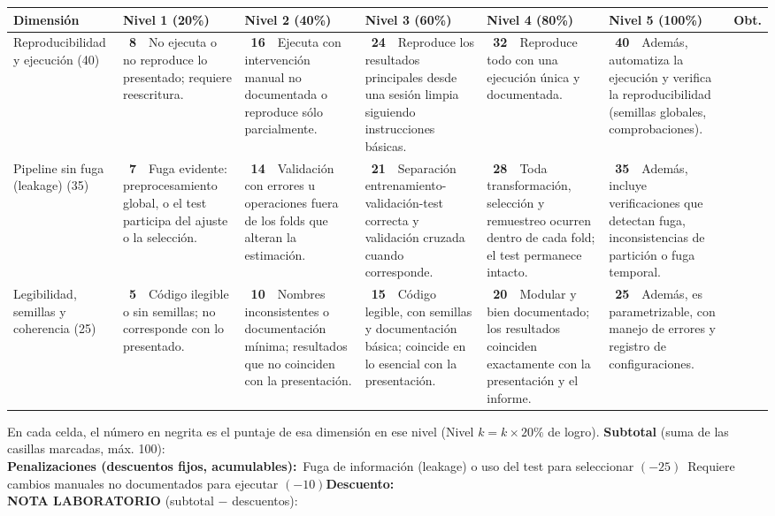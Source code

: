 \documentclass[11pt,letterpaper]{article}
\newcommand{\chk}{\framebox[0.42cm]{\rule{0pt}{0.30cm}}}
\begin{document}
\footnotesize\renewcommand{\arraystretch}{1.15}
\begin{tabular}{p{2.4cm} p{3.15cm} p{3.15cm} p{3.15cm} p{3.15cm} p{3.15cm} p{1.2cm}}
\toprule
Dimensión & Nivel 1 (20\%) & Nivel 2 (40\%) & Nivel 3 (60\%) & Nivel 4 (80\%) & Nivel 5 (100\%) & Obt. \\
\midrule
Reproducibilidad y ejecución (40) & \chk\ \textbf{8}~~No ejecuta o no reproduce lo presentado; requiere reescritura. & \chk\ \textbf{16}~~Ejecuta con intervención manual no documentada o reproduce sólo parcialmente. & \chk\ \textbf{24}~~Reproduce los resultados principales desde una sesión limpia siguiendo instrucciones básicas. & \chk\ \textbf{32}~~Reproduce todo con una ejecución única y documentada. & \chk\ \textbf{40}~~Además, automatiza la ejecución y verifica la reproducibilidad (semillas globales, comprobaciones). & \rule{0pt}{0.7cm} \\
Pipeline sin fuga (leakage) (35) & \chk\ \textbf{7}~~Fuga evidente: preprocesamiento global, o el test participa del ajuste o la selección. & \chk\ \textbf{14}~~Validación con errores u operaciones fuera de los folds que alteran la estimación. & \chk\ \textbf{21}~~Separación entrenamiento-validación-test correcta y validación cruzada cuando corresponde. & \chk\ \textbf{28}~~Toda transformación, selección y remuestreo ocurren dentro de cada fold; el test permanece intacto. & \chk\ \textbf{35}~~Además, incluye verificaciones que detectan fuga, inconsistencias de partición o fuga temporal. & \rule{0pt}{0.7cm} \\
Legibilidad, semillas y coherencia (25) & \chk\ \textbf{5}~~Código ilegible o sin semillas; no corresponde con lo presentado. & \chk\ \textbf{10}~~Nombres inconsistentes o documentación mínima; resultados que no coinciden con la presentación. & \chk\ \textbf{15}~~Código legible, con semillas y documentación básica; coincide en lo esencial con la presentación. & \chk\ \textbf{20}~~Modular y bien documentado; los resultados coinciden exactamente con la presentación y el informe. & \chk\ \textbf{25}~~Además, es parametrizable, con manejo de errores y registro de configuraciones. & \rule{0pt}{0.7cm} \\
\bottomrule
\end{tabular}

\vspace{0.2cm}
{\small
En cada celda, el número en negrita es el puntaje de esa dimensión en ese nivel (Nivel $k = k\times 20\%$ de logro). \textbf{Subtotal} (suma de las casillas marcadas, máx. 100): \underline{\hspace{2cm}}\\[0.2cm]
\textbf{Penalizaciones (descuentos fijos, acumulables):}\quad \chk\ Fuga de información (leakage) o uso del test para seleccionar $(-25)$\quad \chk\ Requiere cambios manuales no documentados para ejecutar $(-10)$\quad \textbf{Descuento:} \underline{\hspace{1.6cm}}\\[0.2cm]
\textbf{NOTA LABORATORIO} (subtotal $-$ descuentos): \underline{\hspace{2.2cm}}
}
\end{document}
